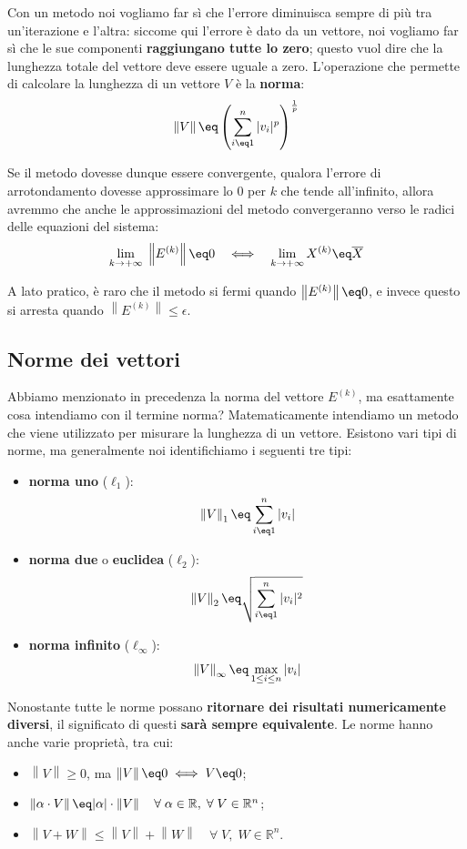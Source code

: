 Con un metodo noi vogliamo far sì che l'errore diminuisca sempre di più tra un'iterazione e l'altra: siccome qui l'errore è dato da un vettore, noi vogliamo far sì che le sue componenti \textbf{raggiungano tutte lo zero}; questo vuol dire che la lunghezza totale del vettore deve essere uguale a zero. L'operazione che permette di calcolare la lunghezza di un vettore $V$ è la \textbf{norma}:
\[ \left\| V \right\| \eq \left( \sum_{i \eq 1}^n |v_i|^p \right)^{\frac{1}{p}} \]

Se il metodo dovesse dunque essere convergente, qualora l'errore di arrotondamento dovesse approssimare lo 0 per $k$ che tende all'infinito, allora avremmo che anche le approssimazioni del metodo convergeranno verso le radici delle equazioni del sistema:
\[ \lim_{k \to +\infty} \; \left\| E^{(k)} \right\| \eq 0 \quad \Longleftrightarrow \quad \lim_{k \to +\infty} X^{(k)} \eq \overline{X} \]

A lato pratico, è raro che il metodo si fermi quando $\left\| E^{(k)} \right\| \eq 0$, e invece questo si arresta quando $\left\| E^{(k)} \right\| \leq \epsilon$.

\subsection{Norme dei vettori}

Abbiamo menzionato in precedenza la norma del vettore $E^{(k)}$, ma esattamente cosa intendiamo con il termine norma? Matematicamente intendiamo un metodo che viene utilizzato per misurare la lunghezza di un vettore. Esistono vari tipi di norme, ma generalmente noi identifichiamo i seguenti tre tipi:
\begin{itemize}
    \item \textbf{norma uno} ($\ell_1$):
    \[ \left\| V \right\|_1 \eq \sum_{i \eq 1}^n |v_i| \]

    \item \textbf{norma due} o \textbf{euclidea} ($\ell_2$):
    \[ \left\| V \right\|_2 \eq \sqrt{\sum_{i \eq 1}^n |v_i|^2} \]

    \item \textbf{norma infinito} ($\ell_\infty$):
    \[ \left\| V \right\|_\infty \eq \max_{1 \leq i \leq n} |v_i| \]
\end{itemize}

Nonostante tutte le norme possano \textbf{ritornare dei risultati numericamente diversi}, il significato di questi \textbf{sarà sempre equivalente}. Le norme hanno anche varie proprietà, tra cui:
\begin{itemize}
    \item $\left\| V \right\| \geq 0$, ma $\left\| V \right\| \eq 0 \; \Longleftrightarrow \; V \eq 0$;
    \item $\left\| \alpha \cdot V \right\| \eq |\alpha| \cdot \left\| V \right\| \quad \forall \; \alpha \in \mathbb{R}, \; \forall \; V \in \mathbb{R}^n$;
    \item $\left\| V + W \right\| \leq \left\| V \right\| + \left\| W \right\| \quad \forall \; V, \; W \in \mathbb{R}^n$.
\end{itemize}

